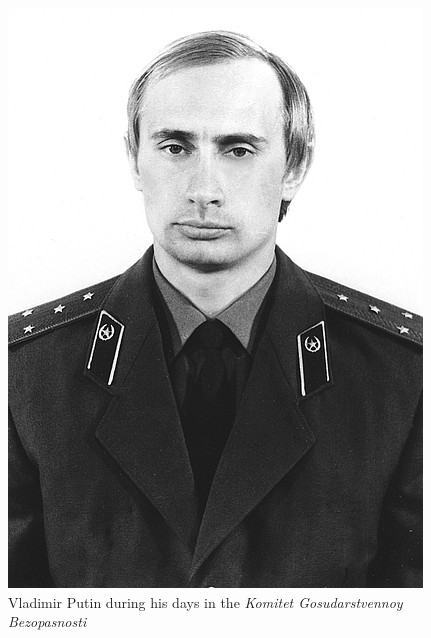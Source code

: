 \documentclass[conference]{IEEEtran}
\begin{document}
\begin{figure}[htbp]
\centerline{\includegraphics[width = \linewidth]{3}}
\label{fig3}
\caption{Vladimir Putin during his days in the \textit{Komitet Gosudarstvennoy Bezopasnosti}}
\end{figure}
\end{document}
